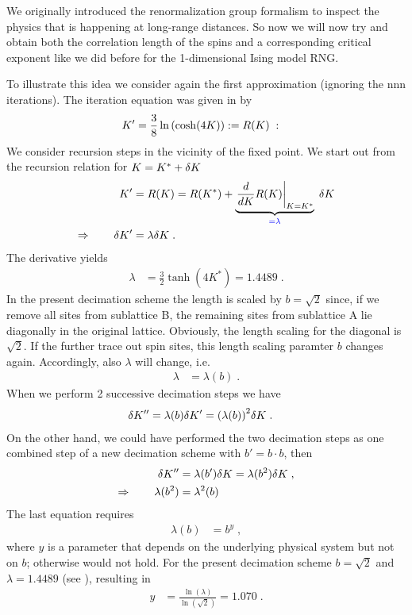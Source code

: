 We originally introduced the renormalization group formalism to inspect the physics that is happening at long-range distances. So now we will now try and obtain both the correlation length of the spins and a corresponding critical exponent like we did before for the 1-dimensional Ising model RNG.

To illustrate this idea we consider again the first approximation (ignoring the nnn
iterations). The iteration equation  was given in
 by
%
\begin{align*}
K' &= \frac{3}{8} \ln\qty( \cosh(4K)  ) := R(K)\;:
\end{align*}
%
We consider recursion steps in the vicinity of the fixed point.
We start out from the recursion relation for $K = K^{*}+\var K$
%
\begin{align*}
K' &= R(K) =R(K^{*}) + \underbrace{
\eval{\frac{d}{dK} R(K)}_{K=K^{*}}
}_{\color{blue} = \lambda}\;\var K\\
\Rightarrow\qquad \var K' &= \lambda \var K\;.
\end{align*}
%
The derivative yields
\begin{align}\label{eq:lambda}
\lambda &= \frac{3}{2} \tanh(4 K^{*}) = 1.4489\;.
\end{align}
%
In the present decimation scheme the length is scaled by $b=\sqrt{2}$ since, if we remove all sites from sublattice B, the remaining sites from sublattice A lie diagonally in the original lattice. Obviously, the length scaling for the diagonal is $\sqrt{2}$. If the further trace out spin sites, this length scaling paramter $b$ changes again. Accordingly, also $\lambda$ will change, i.e.
%
\begin{align*}
\lambda &= \lambda(b)\;.
\end{align*}
%
When we perform 2 successive decimation steps  we have 
%
\begin{align*}
\var K'' &=\lambda(b) \var K' = \qty(\lambda(b))^{2} \var K\;.
\end{align*}
%
On the other hand, we could have performed the two decimation steps as one combined step of a new decimation scheme with $b'=b\cdot b$, then
%
\begin{align}
\var K'' &=\lambda(b') \var K = \lambda(b^2) \var K\;,\nonumber \\
\Rightarrow\qquad \lambda(b^{2}) &= \lambda^{2}(b)\;\label{eq:RG:b}
\end{align}
%
The last equation requires
%
\begin{align*}
\lambda(b) &= b^{y}\;,
\end{align*}
%
where $y$ is a parameter that depends on the underlying physical system but not on $b$;
otherwise  would not hold. For the present decimation scheme $b=\sqrt{2}$ and 
$\lambda=1.4489$ (see ), resulting in 
%
\begin{align}\label{eq:2d:rng:y}
y &= \frac{\ln(\lambda)}{\ln(\sqrt{2})} = 1.070\;.
\end{align}
%


